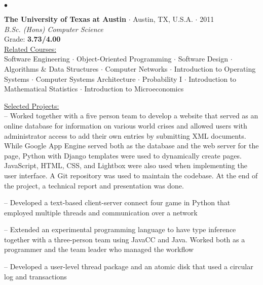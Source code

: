 \documentclass[11pt]{article}
\newcommand{\schoolwithGPA}[6]
{
  \textbf{#1} 
  $\cdot$ #2 
  $\cdot$ #3 \\
  \emph{#4}\\ 
  Grade: \textbf{#5} \\ \vspace{2mm}
  \underline{Related Courses:} \\ \vspace{1mm} #6
  \vspace*{5pt}
}
\begin{document}
\vspace{5mm}

\hspace*{-12pt}$\bullet$
\schoolwithGPA{The University of Texas at Austin}{ Austin, TX, U.S.A.}{2011}{B.Sc. (Hons) Computer Science}
{3.73/4.00}{Software Engineering $\cdot$ Object-Oriented Programming $\cdot$ Software Design $\cdot$ Algorithms \& Data Structures $\cdot$ Computer Networks $\cdot$ Introduction to Operating Systems $\cdot$ Computer Systems Architecture $\cdot$ Probability I $\cdot$ Introduction to Mathematical Statistics $\cdot$ Introduction to Microeconomics}

\vspace{1mm} \underline{Selected Projects:} \\
\vspace{2mm}
-- Worked together with a five person team to develop a website that served as an online database for information on various world crises and allowed users with administrator access to add their own entries by submitting XML documents. While Google App Engine served both as the database and the web server for the page, Python with Django templates were used to dynamically create pages. JavaScript, HTML, CSS, and Lightbox were also used when implementing the user interface. A Git repository was used to maintain the codebase. At the end of the project, a technical report and presentation was done. \\

\vspace{2mm}

-- Developed a text-based client-server connect four game in Python that employed multiple threads and communication over a network

\vspace{2mm}


-- Extended an experimental programming language to have type inference together with a three-person team using JavaCC and Java. Worked both as a programmer and the team leader who managed the workflow

\vspace{2mm}

-- Developed a user-level thread package and an atomic disk that used a circular log and transactions

\vspace{5mm}
\end{document}
